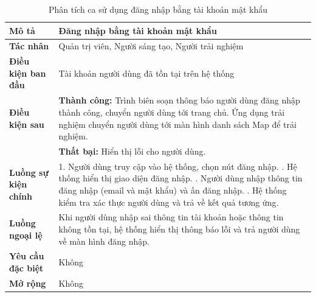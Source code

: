 \begin{table}
\centering
\caption{Phân tích ca sử dụng đăng nhập bằng tài khoản mật khẩu}
\begin{tabular}{|p{4cm}|p{10cm}|}
\hline
\textbf{Mô tả} & Đăng nhập bằng tài khoản mật khẩu \\ \hline
\textbf{Tác nhân} & Quản trị viên, Người sáng tạo, Người trải nghiệm \\ \hline
\textbf{Điều kiện ban đầu} & Tài khoản người dùng đã tồn tại trên hệ thống \\ \hline
\textbf{Điều kiện sau} & 
\textbf{Thành công:} Trình biên soạn thông báo người dùng đăng nhập thành công, chuyển người dùng tới trang chủ. Ứng dụng trải nghiệm chuyển người dùng tới màn hình danh sách Map để trải nghiệm. \\
& \textbf{Thất bại:} Hiển thị lỗi cho người dùng. \\ \hline
\textbf{Luồng sự kiện chính} & 
1. Người dùng truy cập vào hệ thống, chọn nút đăng nhập. \newline
2. Hệ thống hiển thị giao diện đăng nhập. \newline
3. Người dùng nhập thông tin đăng nhập (email và mật khẩu) và ấn đăng nhập. \newline
4. Hệ thống kiểm tra xác thực người dùng và trả về kết quả tương ứng. \\ \hline
\textbf{Luồng ngoại lệ} & Khi người dùng nhập sai thông tin tài khoản hoặc thông tin không tồn tại, hệ thống hiển thị thông báo lỗi và trả người dùng về màn hình đăng nhập. \\ \hline
\textbf{Yêu cầu đặc biệt} & Không \\ \hline
\textbf{Mở rộng} & Không \\ \hline
\end{tabular}
\end{table}

